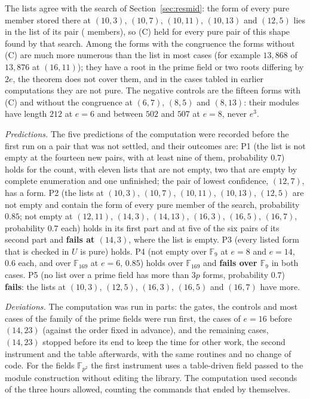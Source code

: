 \documentclass[11pt]{article}
\theoremstyle{definition}
\theoremstyle{remark}
\newcommand{\F}{\mathbb{F}}
\begin{document}
The lists agree with the search of Section~\ref{sec:resmid}: the form of every pure member stored there at $(10,3)$, $(10,7)$, $(10,11)$, $(10,13)$ and $(12,5)$ lies in the list of its pair (\nlstEFourteenMembers{} members), so (C) held for every pure pair of this shape found by that search. Among the forms with the congruence the forms without (C) are much more numerous than the list in most cases (for example $13{,}868$ of $13{,}876$ at $(16,11)$); they have a root in the prime field or two roots differing by $2e$, the theorem does not cover them, and in the cases tabled in earlier computations they are not pure. The negative controls are the fifteen forms with (C) and without the congruence at $(6,7)$, $(8,5)$ and $(8,13)$: their modules have length $212$ at $e=6$ and between $502$ and $507$ at $e=8$, never $e^3$.

\emph{Predictions.} The five predictions of the computation were recorded before the first run on a pair that was not settled, and their outcomes are: P1 (the list is not empty at the fourteen new pairs, with at least nine of them, probability $0.7$) holds for the count, with eleven lists that are not empty, two that are empty by complete enumeration and one unfinished; the pair of lowest confidence, $(12,7)$, has a form. P2 (the lists at $(10,3)$, $(10,7)$, $(10,11)$, $(10,13)$, $(12,5)$ are not empty and contain the form of every pure member of the search, probability $0.85$; not empty at $(12,11)$, $(14,3)$, $(14,13)$, $(16,3)$, $(16,5)$, $(16,7)$, probability $0.7$ each) holds in its first part and at five of the six pairs of its second part and \textbf{fails at $(14,3)$}, where the list is empty. P3 (every listed form that is checked in $U$ is pure) holds. P4 (not empty over $\F_9$ at $e=8$ and $e=14$, $0.6$ each, and over $\F_{169}$ at $e=6$, $0.85$) holds over $\F_{169}$ and \textbf{fails over $\F_9$} in both cases. P5 (no list over a prime field has more than $3p$ forms, probability $0.7$) \textbf{fails}: the lists at $(10,3)$, $(12,5)$, $(16,3)$, $(16,5)$ and $(16,7)$ have more.

\emph{Deviations.} The computation was run in parts: the gates, the controls and most cases of the family of the prime fields were run first, the cases of $e=16$ before $(14,23)$ (against the order fixed in advance), and the remaining cases, $(14,23)$ stopped before its end to keep the time for other work, the second instrument and the table afterwards, with the same routines and no change of code. For the fields $\F_{p^2}$ the first instrument uses a table-driven field passed to the module construction without editing the library. The computation used \nlstSeconds{} seconds of the three hours allowed, counting the commands that ended by themselves.
\end{document}
